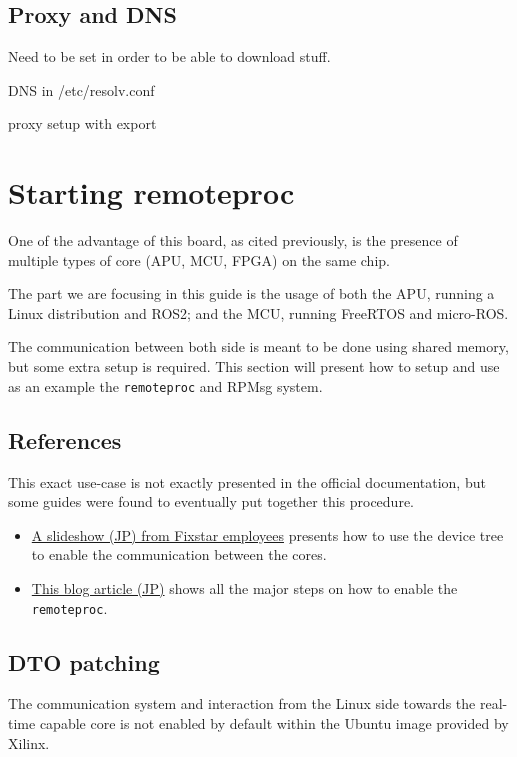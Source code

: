 \documentclass[10pt]{article}
\begin{document}
\subsection{Proxy and DNS}
\label{sec:proxy-dns}
Need to be set in order to be able to download stuff.

DNS in /etc/resolv.conf

proxy setup with export

\section{Starting remoteproc}
\label{sec:starting-remoteproc}
One of the advantage of this board, as cited previously, is the presence of
multiple types of core (APU, MCU, FPGA) on the same chip.

The part we are focusing in this guide is the usage of both the APU, running
a Linux distribution and ROS2; and the MCU, running FreeRTOS and micro-ROS.

The communication between both side is meant to be done using shared memory, but
some extra setup is required.
This section will present how to setup and use as an example the \verb|remoteproc|
and RPMsg system.

\subsection{References}
\label{sec:referances}
This exact use-case is not exactly presented in the official documentation, but some
guides were found to eventually put together this procedure.

\begin{itemize}
\item \href{https://speakerdeck.com/fixstars/fpga-seminar-12-fixstars-corporation-20220727}{A slideshow (JP) from Fixstar employees} presents how
  to use the device tree to enable the communication between the cores.
\item \href{https://zenn.dev/ryuz88/articles/kv260_setup_memo_ubuntu22}{This blog article (JP)} shows all the major steps on how to enable the \verb|remoteproc|.
\end{itemize}


\subsection{DTO patching}
\label{sec:dto-patching}
The communication system and interaction from the Linux side towards the real-time capable core
is not enabled by default within the Ubuntu image provided by Xilinx.
\end{document}
